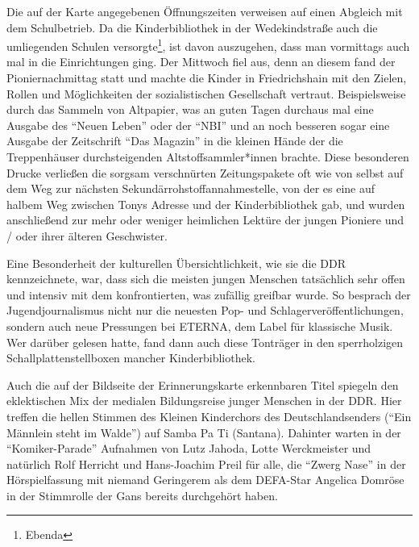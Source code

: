 \documentclass[a4paper,
fontsize=11pt,
oneside,
numbers=noperiodatend,
parskip=half-,
bibliography=totoc,
final
]{scrartcl}
\begin{document}
Die auf der Karte angegebenen Öffnungszeiten verweisen auf einen
Abgleich mit dem Schulbetrieb. Da die Kinderbibliothek in der
Wedekindstraße auch die umliegenden Schulen versorgte\footnote{Ebenda},
ist davon auszugehen, dass man vormittags auch mal in die Einrichtungen
ging. Der Mittwoch fiel aus, denn an diesem fand der Pioniernachmittag
statt und machte die Kinder in Friedrichshain mit den Zielen, Rollen und
Möglichkeiten der sozialistischen Gesellschaft vertraut. Beispielsweise
durch das Sammeln von Altpapier, was an guten Tagen durchaus mal eine
Ausgabe des \enquote{Neuen Leben} oder der \enquote{NBI} und an noch
besseren sogar eine Ausgabe der Zeitschrift \enquote{Das Magazin} in die
kleinen Hände der die Treppenhäuser durchsteigenden
Altstoffsammler*innen brachte. Diese besonderen Drucke verließen die
sorgsam verschnürten Zeitungspakete oft wie von selbst auf dem Weg zur
nächsten Sekundärrohstoffannahmestelle, von der es eine auf halbem Weg
zwischen Tonys Adresse und der Kinderbibliothek gab, und wurden
anschließend zur mehr oder weniger heimlichen Lektüre der jungen
Pioniere und / oder ihrer älteren Geschwister.

Eine Besonderheit der kulturellen Übersichtlichkeit, wie sie die DDR
kennzeichnete, war, dass sich die meisten jungen Menschen tatsächlich
sehr offen und intensiv mit dem konfrontierten, was zufällig greifbar
wurde. So besprach der Jugendjournalismus nicht nur die neuesten Pop-
und Schlagerveröffentlichungen, sondern auch neue Pressungen bei ETERNA,
dem Label für klassische Musik. Wer darüber gelesen hatte, fand dann
auch diese Tonträger in den sperrholzigen Schallplattenstellboxen
mancher Kinderbibliothek.

Auch die auf der Bildseite der Erinnerungskarte erkennbaren Titel
spiegeln den eklektischen Mix der medialen Bildungsreise junger Menschen
in der DDR. Hier treffen die hellen Stimmen des Kleinen Kinderchors des
Deutschlandsenders (\enquote{Ein Männlein steht im Walde}) auf Samba Pa
Ti (Santana). Dahinter warten in der \enquote{Komiker-Parade} Aufnahmen
von Lutz Jahoda, Lotte Werckmeister und natürlich Rolf Herricht und
Hans-Joachim Preil für alle, die \enquote{Zwerg Nase} in der
Hörspielfassung mit niemand Geringerem als dem DEFA-Star Angelica
Domröse in der Stimmrolle der Gans bereits durchgehört haben.
\end{document}
